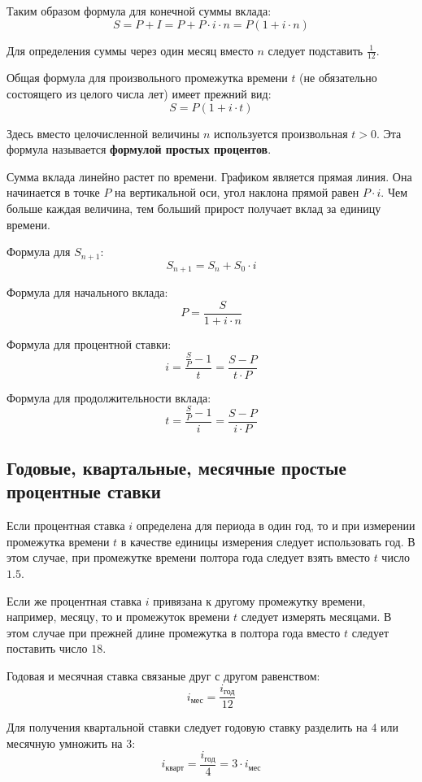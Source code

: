 \documentclass[aps,%
12pt,%
final,%
oneside,
onecolumn,%
musixtex, %
superscriptaddress,%
centertags]{article} %
\theoremstyle{plain}
\theoremstyle{definition}
\theoremstyle{remark}
\begin{document}
Таким образом формула для конечной суммы вклада:
$$S = P + I = P + P \cdot i \cdot n = P (1 + i \cdot n)$$

Для определения суммы через один месяц вместо $n$ следует подставить $\frac{1}{12}$.

Общая формула для произвольного промежутка времени $t$ (не обязательно состоящего из целого числа лет) имеет прежний вид:
$$S  = P (1 + i \cdot t)$$

Здесь вместо целочисленной величины $n$ используется произвольная $t >0$. Эта формула называется \textbf{формулой простых процентов}.

Сумма вклада линейно растет по времени. Графиком является прямая линия. Она начинается в точке $P$ на вертикальной оси, угол наклона прямой равен $P\cdot i$. Чем больше каждая величина, тем больший прирост получает вклад за единицу времени.

Формула для $S_{n+1}$: $$S_{n+1}=S_n+S_0\cdot i  $$

Формула для начального вклада: $$P=\frac{S}{1+i\cdot n} $$

Формула для процентной ставки: $$i=\frac{\frac{S}{P}-1}{t}=\frac{S-P}{t\cdot P}$$

Формула для продолжительности вклада: $$ t=\frac{\frac{S}{P}-1}{i}=\frac{S-P}{i\cdot P}$$


\subsection{Годовые, квартальные, месячные простые процентные ставки}

Если процентная ставка $i$ определена для периода в один год, то и при измерении промежутка времени $t$ в качестве единицы измерения следует использовать год. В этом случае, при промежутке времени полтора года следует взять вместо $t$ число $1.5$.

Если же процентная ставка $i$ привязана к другому промежутку времени, например, месяцу, то и промежуток времени $t$ следует измерять месяцами. В этом случае при прежней длине промежутка в полтора года вместо $t$ следует поставить число $18$.

Годовая и месячная ставка связаные друг с другом равенством:
$$i_{\text{мес}} = \frac{i_{\text{год}}}{12}$$

Для получения квартальной ставки следует годовую ставку разделить на $4$ или месячную умножить на $3$:
$$i_{\text{кварт}} = \frac{i_{\text{год}}}{4} = 3 \cdot i_{\text{мес}}$$
\end{document}
